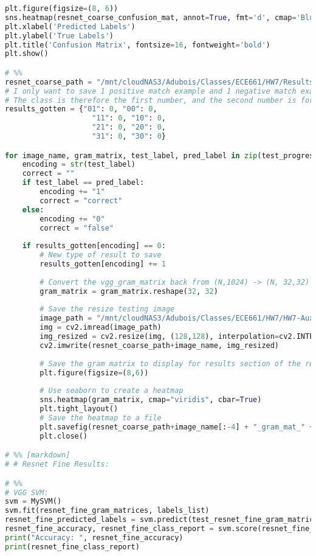 \documentclass{article}
\begin{document}
\begin{lstlisting}[language=Python]
plt.figure(figsize=(8, 6))
sns.heatmap(resnet_coarse_confusion_mat, annot=True, fmt='d', cmap='Blues', cbar=False)
plt.xlabel('Predicted Labels')
plt.ylabel('True Labels')
plt.title('Confusion Matrix', fontsize=16, fontweight='bold')
plt.show()

# %%
resnet_coarse_path = "/mnt/cloudNAS3/Adubois/Classes/ECE661/HW7/Results/Resnet_Coarse_Results/"
# I only want to save 1 positive match example and 1 negative match example for each class
# The class is therefore the first number, and the second number is for matching labels or not
results_gotten = {"01": 0, "00": 0,
                    "11": 0, "10": 0,
                    "21": 0, "20": 0,
                    "31": 0, "30": 0}

for image_name, gram_matrix, test_label, pred_label in zip(test_progress_bar, test_resnet_coarse_gram_matrices, test_labels_list, resnet_coarse_predicted_labels):
    encoding = str(test_label)
    correct = ""
    if test_label == pred_label:
        encoding += "1"
        correct = "correct"
    else:
        encoding += "0"
        correct = "false"
    
    if results_gotten[encoding] == 0:
        # New type of result to save
        results_gotten[encoding] += 1
        
        # Convert the vgg_gram_matrix back from (N,1024) -> (N, 32,32) for display
        gram_matrix = gram_matrix.reshape(32, 32)
        
        # Save the resize testing image
        image_path = "/mnt/cloudNAS3/Adubois/Classes/ECE661/HW7/HW7-Auxilliary/data/testing/" + image_name
        img = cv2.imread(image_path)
        img_resized = cv2.resize(img, (128,128), interpolation=cv2.INTER_AREA)
        cv2.imwrite(resnet_coarse_path+image_name, img_resized)
        
        # Save the gram matrix to display for results section of the report
        plt.figure(figsize=(8,6))
        
        # Use seaborn to create a heatmap
        sns.heatmap(gram_matrix, cmap="viridis", cbar=True)
        plt.tight_layout()
        # Save the heatmap to a file
        plt.savefig(resnet_coarse_path+image_name[:-4] + "_gram_mat_" + correct + ".png", format='png', dpi=300, bbox_inches="tight")
        plt.close()

# %% [markdown]
# # Resnet Fine Results:

# %%
# VGG SVM:
svm = MySVM()
svm.fit(resnet_fine_gram_matrices, labels_list)
resnet_fine_predicted_labels = svm.predict(test_resnet_fine_gram_matrices)
resnet_fine_accuracy, resnet_fine_class_report = svm.score(resnet_fine_predicted_labels, test_labels_list)
print("Accuracy: ", resnet_fine_accuracy)
print(resnet_fine_class_report)


\end{lstlisting}
\end{document}
